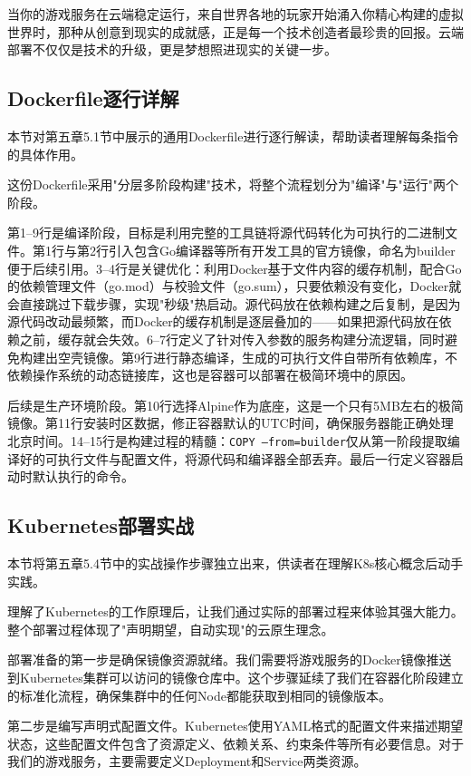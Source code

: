 当你的游戏服务在云端稳定运行，来自世界各地的玩家开始涌入你精心构建的虚拟世界时，那种从创意到现实的成就感，正是每一个技术创造者最珍贵的回报。云端部署不仅仅是技术的升级，更是梦想照进现实的关键一步。

\subsection{Dockerfile逐行详解}
\label{sec:appendix-dockerfile}

本节对第五章5.1节中展示的通用Dockerfile进行逐行解读，帮助读者理解每条指令的具体作用。

这份Dockerfile采用"分层多阶段构建"技术，将整个流程划分为"编译"与"运行"两个阶段。

第1--9行是编译阶段，目标是利用完整的工具链将源代码转化为可执行的二进制文件。第1行与第2行引入包含Go编译器等所有开发工具的官方镜像，命名为builder便于后续引用。3--4行是关键优化：利用Docker基于文件内容的缓存机制，配合Go的依赖管理文件（go.mod）与校验文件（go.sum），只要依赖没有变化，Docker就会直接跳过下载步骤，实现"秒级"热启动。源代码放在依赖构建之后复制，是因为源代码改动最频繁，而Docker的缓存机制是逐层叠加的——如果把源代码放在依赖之前，缓存就会失效。6--7行定义了针对传入参数的服务构建分流逻辑，同时避免构建出空壳镜像。第9行进行静态编译，生成的可执行文件自带所有依赖库，不依赖操作系统的动态链接库，这也是容器可以部署在极简环境中的原因。

后续是生产环境阶段。第10行选择Alpine作为底座，这是一个只有5MB左右的极简镜像。第11行安装时区数据，修正容器默认的UTC时间，确保服务器能正确处理北京时间。14--15行是构建过程的精髓：\texttt{COPY --from=builder}仅从第一阶段提取编译好的可执行文件与配置文件，将源代码和编译器全部丢弃。最后一行定义容器启动时默认执行的命令。

\subsection{Kubernetes部署实战}
\label{sec:appendix-k8s-deploy}

本节将第五章5.4节中的实战操作步骤独立出来，供读者在理解K8s核心概念后动手实践。

理解了Kubernetes的工作原理后，让我们通过实际的部署过程来体验其强大能力。整个部署过程体现了"声明期望，自动实现"的云原生理念。

部署准备的第一步是确保镜像资源就绪。我们需要将游戏服务的Docker镜像推送到Kubernetes集群可以访问的镜像仓库中。这个步骤延续了我们在容器化阶段建立的标准化流程，确保集群中的任何Node都能获取到相同的镜像版本。

第二步是编写声明式配置文件。Kubernetes使用YAML格式的配置文件来描述期望状态，这些配置文件包含了资源定义、依赖关系、约束条件等所有必要信息。对于我们的游戏服务，主要需要定义Deployment和Service两类资源。

